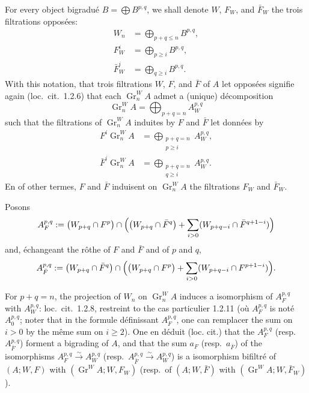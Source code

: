 \documentclass[12pt,a4paper]{article}
\theoremstyle{plain}
\theoremstyle{definition}
\DeclareMathOperator{\Gr}{Gr}
\begin{document}
For every object bigradu\'{e} $B = \bigoplus B^{p,q}$, we shall denote $W$, $F_W$, and $\bar{F}_W$
the trois filtrations oppos\'{e}es:
\begin{align*}
W_n &= \bigoplus_{p+q \leq n} B^{p,q}, \\
F_W^i &= \bigoplus_{p \geq i} B^{p,q}, \\
\bar{F}_W^i &= \bigoplus_{q \geq i} B^{p,q}.
\end{align*}
With this notation, that trois filtrations $W$, $F$, and $\bar{F}$ of $A$ let oppos\'{e}es
signifie again (loc.~cit.~1.2.6) that each $\Gr_n^W A$ admet a (unique)
d\'{e}composition
\begin{equation*}
\Gr_n^W A = \bigoplus_{p+q=n} A_W^{p,q}
\end{equation*}
such that the filtrations of $\Gr_n^W A$ induites by $F$ and $\bar{F}$ let donn\'{e}es by
\begin{align*}
F^i \Gr_n^W A &= \bigoplus_{\substack{p+q=n \\ p \geq i}} A_W^{p,q}, \\
\bar{F}^i \Gr_n^W A &= \bigoplus_{\substack{p+q=n \\ q \geq i}} A_W^{p,q}.
\end{align*}
En of other termes, $F$ and $\bar{F}$ induisent on $\Gr_n^W A$ the filtrations $F_W$ and $\bar{F}_W$.

Posons
\begin{equation*}
A_F^{p,q} := \bigl(W_{p+q} \cap F^p\bigr) \cap \Bigl( \bigl(W_{p+q} \cap \bar{F}^q\bigr) + \sum_{i>0} (W_{p+q-i} \cap \bar{F}^{q+1-i}) \Bigr)
\end{equation*}
and, \'{e}changeant the r\^{o}the of $F$ and $\bar{F}$ and of $p$ and $q$,
\begin{equation*}
A_{\bar{F}}^{p,q} := \bigl(W_{p+q} \cap \bar{F}^q\bigr) \cap \Bigl( \bigl(W_{p+q} \cap F^p\bigr) + \sum_{i>0} (W_{p+q-i} \cap F^{p+1-i}) \Bigr).
\end{equation*}

For $p+q=n$, the projection of $W_n$ on $\Gr_n^W A$ induces a isomorphism
of $A_F^{p,q}$ with $A_W^{p,q}$: loc.~cit.~1.2.8, restreint to the cas particulier 1.2.11 (o\`{u} $A_F^{p,q}$
is not\'{e} $A_0^{p,q}$; noter that in the formule d\'{e}finissant $A_F^{p,q}$, one can remplacer
the sum on $i > 0$ by the m\^{e}me sum on $i \geq 2$). One en d\'{e}duit (loc.
cit.) that the $A_F^{p,q}$ (resp.~$A_{\bar{F}}^{p,q}$) forment a bigrading of $A$, and that the
sum $a_F$ (resp.~$a_{\bar{F}}$) of the isomorphisms $A_F^{p,q} \xrightarrow{\sim} A_W^{p,q}$
(resp.~$A_{\bar{F}}^{p,q} \xrightarrow{\sim} A_W^{p,q}$)
is a isomorphism bifiltr\'{e} of $(A; W, F)$ with $(\Gr^W\!A; W, F_W)$ (resp.~of
$(A; W, \bar{F})$ with $(\Gr^W\!A; W, \bar{F}_W)$).
\end{document}

